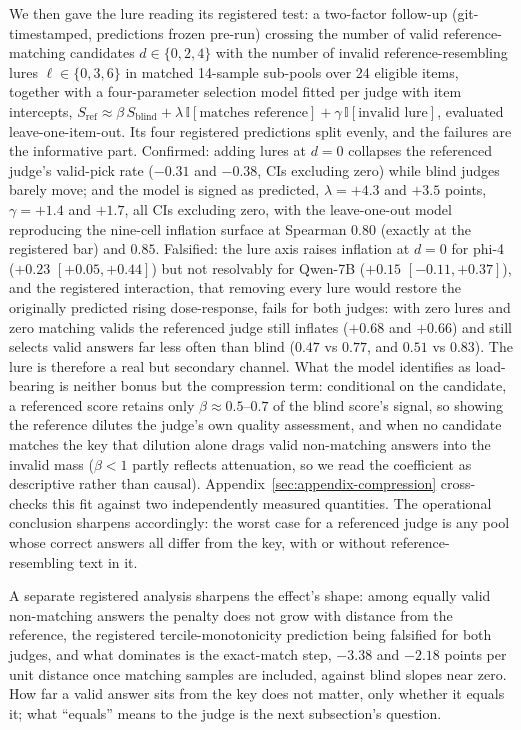 \documentclass[11pt]{article}
\begin{document}
We then gave the lure reading its registered test: a two-factor follow-up (git-timestamped, predictions frozen pre-run) crossing the number of valid reference-matching candidates $d \in \{0,2,4\}$ with the number of invalid reference-resembling lures $\ell \in \{0,3,6\}$ in matched 14-sample sub-pools over 24 eligible items, together with a four-parameter selection model fitted per judge with item intercepts, $S_{\mathrm{ref}} \approx \beta\, S_{\mathrm{blind}} + \lambda\, \mathbb{I}[\text{matches reference}] + \gamma\, \mathbb{I}[\text{invalid lure}]$, evaluated leave-one-item-out.
Its four registered predictions split evenly, and the failures are the informative part.
Confirmed: adding lures at $d{=}0$ collapses the referenced judge's valid-pick rate ($-0.31$ and $-0.38$, CIs excluding zero) while blind judges barely move; and the model is signed as predicted, $\lambda = +4.3$ and $+3.5$ points, $\gamma = +1.4$ and $+1.7$, all CIs excluding zero, with the leave-one-out model reproducing the nine-cell inflation surface at Spearman $0.80$ (exactly at the registered bar) and $0.85$.
Falsified: the lure axis raises inflation at $d{=}0$ for phi-4 ($+0.23$ $[+0.05,+0.44]$) but not resolvably for Qwen-7B ($+0.15$ $[-0.11,+0.37]$), and the registered interaction, that removing every lure would restore the originally predicted rising dose-response, fails for both judges: with zero lures and zero matching valids the referenced judge still inflates ($+0.68$ and $+0.66$) and still selects valid answers far less often than blind ($0.47$ vs $0.77$, and $0.51$ vs $0.83$).
The lure is therefore a real but secondary channel.
What the model identifies as load-bearing is neither bonus but the compression term: conditional on the candidate, a referenced score retains only $\beta \approx 0.5$--$0.7$ of the blind score's signal, so showing the reference dilutes the judge's own quality assessment, and when no candidate matches the key that dilution alone drags valid non-matching answers into the invalid mass ($\beta < 1$ partly reflects attenuation, so we read the coefficient as descriptive rather than causal). Appendix~\ref{sec:appendix-compression} cross-checks this fit against two independently measured quantities.
The operational conclusion sharpens accordingly: the worst case for a referenced judge is any pool whose correct answers all differ from the key, with or without reference-resembling text in it.

A separate registered analysis sharpens the effect's shape: among equally valid non-matching answers the penalty does not grow with distance from the reference, the registered tercile-monotonicity prediction being falsified for both judges, and what dominates is the exact-match step, $-3.38$ and $-2.18$ points per unit distance once matching samples are included, against blind slopes near zero.
How far a valid answer sits from the key does not matter, only whether it equals it; what ``equals'' means to the judge is the next subsection's question.
\end{document}
